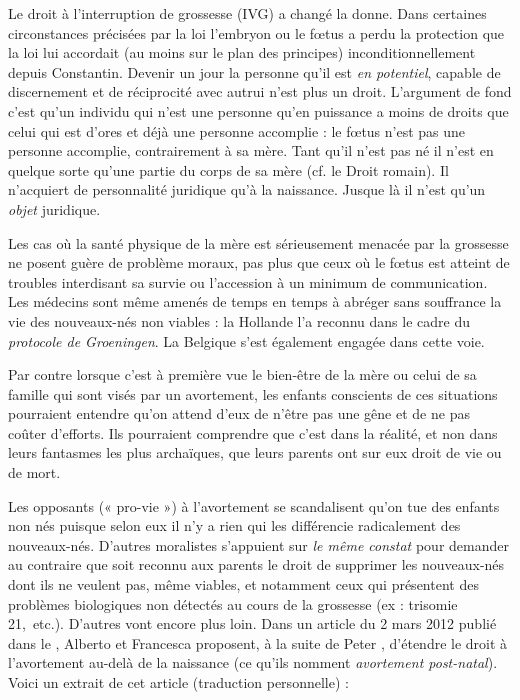  Le droit à l'interruption de grossesse (IVG) a changé la donne. Dans certaines circonstances précisées par la loi l'embryon ou le fœtus a perdu la protection que la loi lui accordait (au moins sur le plan des principes) inconditionnellement depuis Constantin. Devenir un jour la personne qu'il est \emph{en potentiel}, capable de discernement et de réciprocité avec autrui  n'est plus un droit. L'argument de fond c'est qu'un individu qui n'est une personne qu'en puissance a moins de droits que celui qui est d'ores et déjà une personne accomplie : le fœtus n'est pas une personne accomplie, contrairement à sa mère. Tant qu'il n'est pas né il n'est en quelque sorte qu'une partie du corps de sa mère (cf. le Droit romain). Il n'acquiert de personnalité juridique qu'à la naissance. Jusque là il n'est qu'un \emph{objet} juridique. 

 Les cas où la santé physique de la mère est sérieusement menacée par la grossesse ne posent guère de problème moraux, pas plus que ceux où le fœtus est atteint de troubles interdisant sa survie ou l'accession à un minimum de communication. Les médecins sont même amenés de temps en temps à abréger sans souffrance la vie des nouveaux-nés non viables : la Hollande l'a reconnu dans le cadre du \emph{protocole de Groeningen}. La Belgique s'est également engagée dans cette voie. 
 
 Par contre lorsque c'est à première vue le bien-être de la mère ou celui de sa famille qui sont visés par un avortement, les enfants conscients de ces situations pourraient entendre qu'on attend d'eux de n'être pas une gêne et de ne pas coûter d'efforts. Ils pourraient comprendre que c'est dans la réalité, et non dans leurs fantasmes les plus archaïques, que leurs parents ont sur eux droit de vie ou de mort.

 Les opposants (« pro-vie ») à l'avortement se scandalisent qu'on tue des enfants non nés puisque selon eux il n'y a rien qui les différencie radicalement des nouveaux-nés. D'autres moralistes s'appuient sur  \emph{le même constat} pour demander au contraire que soit reconnu aux parents le droit de supprimer les nouveaux-nés dont ils ne veulent pas, même viables, et notamment ceux qui présentent des problèmes biologiques non détectés au cours de la grossesse (ex : trisomie 21,~etc.). D'autres vont encore plus loin. Dans un article du 2 mars 2012 publié dans le , Alberto  et Francesca  proposent, à la suite de Peter , d'étendre le droit à l'avortement au-delà de la naissance (ce qu'ils nomment \emph{avortement post-natal}). Voici un extrait de cet article (traduction personnelle) :

